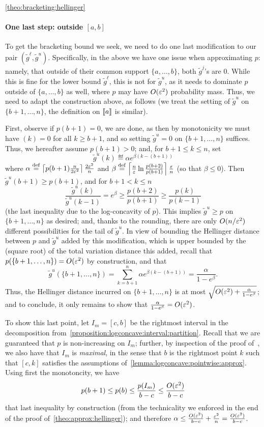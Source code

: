 \begin{proofof}{\cref{theo:bracketing:hellinger}}
\paragraph{One last step: outside $[a,b]$} To get the bracketing bound we seek, we need to do one last modification to our pair $(\tilde{g}^\ell,\tilde{g}^u)$. Specifically, in the above we have one issue when approximating $p$: namely, that outside of their common support $\{a,\dots,b\}$, both $\tilde{g}^j$'s are $0$. While this is fine for the lower bound $\tilde{g}^\ell$, this is not for $\tilde{g}^u$, as it needs to dominate $p$ outside of $\{a,\dots,b\}$ as well, where $p$ may have $O(\varepsilon^2)$  probability mass. Thus, we need to adapt the construction above, as follows (we treat the setting of $\tilde{g}^u$ on $\{b+1,\dots,n\}$, the definition on $\llbracket a\rrbracket$ is similar).

First, observe if $p(b+1)=0$, we are done, as then by monotonicity we must have $(k)=0$ for all $k\geq b+1$, and so setting $\tilde{g}^u=0$ on $\{b+1,\dots,n\}$ suffices. Thus, we hereafter assume $p(b+1)>0$; and, for $b+1\leq k\leq n$, set
\[
    \tilde{g}^u(k) \eqdef \alpha e^{\beta(k-(b+1))}
\]
where $\alpha \stackrel{\rm def}{=} \left\lceil p(b+1)\frac{n}{2\varepsilon^2} \right\rceil\frac{2\varepsilon^2}{n}$ and $\beta \stackrel{\rm def}{=} \left\lceil \frac{n}{\varepsilon}\ln \frac{p(b+2)}{p(b+1)} \right\rceil\frac{\varepsilon}{n}$ (so that $\beta \leq 0$). Then $\tilde{g}^u(b+1)\geq p(b+1)$, and for $b+1<k\leq n$
\[
    \frac{\tilde{g}^u(k)}{\tilde{g}^u(k-1)} = e^\beta \geq \frac{p(b+2)}{p(b+1)} \geq \frac{p(k)}{p(k-1)}
\]
(the last inequality due to the log-concavity of $p$). This implies $\tilde{g}^u\geq p$ on $\{b+1,\dots,n\}$ as desired; and, thanks to the rounding, there are only $O(n/\varepsilon^2)$ different possibilities for the tail of $\tilde{g}^u$. 
In view of bounding the Hellinger distance between $p$ and $\tilde{g}^u$ added by this modification, which is upper bounded by the (square root) of the total variation distance this added, recall that $p(\{b+1,\dots,n\})=O(\varepsilon^2)$ by construction, and that
\[
    \tilde{g}^u(\{b+1,\dots,n\}) = \sum_{k=b+1}^n \alpha e^{\beta(k-(b+1))} = \frac{\alpha}{1-e^\beta}.
\]
Thus, the Hellinger distance incurred on $\{b+1,\dots,n\}$ is at most $\sqrt{O(\varepsilon^2)+\frac{\alpha}{1-e^\beta}}$; and to conclude, it only remains to show that $\frac{\alpha}{1-e^\beta} = O(\varepsilon^2)$.

To show this last point, let $I_m=[c,b]$ be the rightmost interval in the decomposition from~\cref{proposition:logconcave:interval:partition}. Recall that we are guaranteed that $p$ is non-increasing on $I_m$; further, by inspection of the proof of~\cite[Proposition 15]{DKS:16}, we also have that $I_m$ is \emph{maximal}, in the sense that $b$ is the rightmost point $k$ such that $[c,k]$ satisfies the assumptions of~\cref{lemma:logconcave:pointwise:approx}. Using first the monotoncity, we have
\[
    p(b+1)\leq p(b)\leq \frac{p(I_m)}{b-c} \leq \frac{O(\varepsilon^2)}{b-c}
\]
that last inequality by construction (from the technicality we enforced in the end of the proof of~\cref{theo:approx:hellinger}); and therefore $\alpha \leq \frac{O(\varepsilon^2)}{b-c} + \frac{\varepsilon^2}{n} = \frac{O(\varepsilon^2)}{b-c}$.


\end{proofof}
